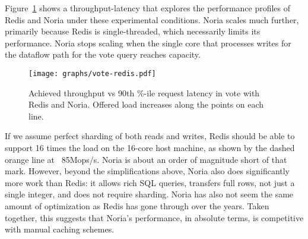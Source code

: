 Figure~\ref{f:vote-redis} shows a throughput-latency that explores the
performance profiles of Redis and Noria under these experimental conditions.
Noria scales much further, primarily because Redis is single-threaded, which
necessarily limits its performance. Noria stops scaling when the single core
that processes writes for the dataflow path for the vote query reaches capacity.

\begin{figure}[ht]
  \centering
  \texttt{[image: graphs/vote-redis.pdf]}
  \caption{Achieved throughput vs 90th \%-ile request latency in vote with Redis
  and Noria. Offered load increases along the points on each line.}
  \label{f:vote-redis}
\end{figure}

If we assume perfect sharding of both reads and writes, Redis should be able to
support 16 times the load on the 16-core host machine, as shown by the dashed
orange line at ~85Mops/s. Noria is about an order of magnitude short of that
mark. However, beyond the simplifications above, Noria also does significantly
more work than Redis: it allows rich SQL queries, transfers full rows, not just
a single integer, and does not require sharding. Noria has also not seem the
same amount of optimization as Redis has gone through over the years. Taken
together, this suggests that Noria's performance, in absolute terms, is
competitive with manual caching schemes.
